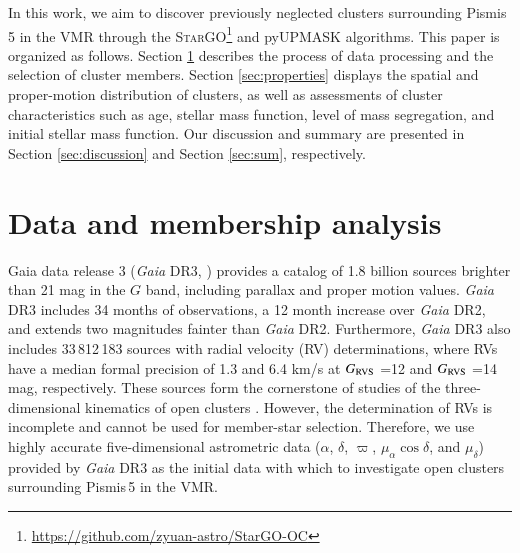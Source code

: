 \documentclass{aa} %
\begin{document}
 


In this work, we aim to discover previously neglected clusters surrounding Pismis\,5 in the VMR through the
\textsc{StarGO}\footnote{\url{https://github.com/zyuan-astro/StarGO-OC}} \citep{2018ApJ...863...26Y}
and pyUPMASK \citep{2021A&A...650A.109P} algorithms. 
This paper is organized as follows. Section \ref{sec:member} describes the process of data processing 
and the selection of cluster members. Section \ref{sec:properties} displays the spatial and 
proper-motion distribution of clusters, as well as assessments of cluster characteristics such as 
age, stellar mass function, level of mass segregation, and initial stellar mass function. Our 
discussion and summary are presented in Section \ref{sec:discussion} and Section \ref{sec:sum}, respectively.




\section{Data and membership analysis} \label{sec:member}

Gaia data release 3 ({\it Gaia} DR3, \citealt{2016A&A...595A...1G,2022arXiv220606207G})
provides a catalog of 1.8 billion sources brighter than 21 mag in the $G$ band, including parallax
and proper motion values. 
{\it Gaia} DR3 includes 34 months of observations, a 12 month increase over
{\it Gaia} DR2, and extends two magnitudes fainter than {\it Gaia} DR2. 
Furthermore, {\it Gaia} DR3 also includes 33\,812\,183 sources with radial velocity (RV) determinations, where RVs have a median formal precision of 1.3 and 6.4 km/s at $G_{\rm RVS}$ =12 and $G_{\rm RVS}$ =14 mag, respectively. These sources form the cornerstone of studies of the three-dimensional kinematics of open clusters \citep{2022arXiv220605902K}. However, the determination of RVs is incomplete and cannot be used 
for member-star selection. Therefore, we use highly accurate 
five-dimensional astrometric data ($\alpha$, $\delta$, $\varpi$, $\mu_\alpha \cos\delta$, and $\mu_\delta$) 
provided by {\it Gaia} DR3 as the initial data with which to investigate open clusters surrounding Pismis\,5 in the VMR.
\end{document}
